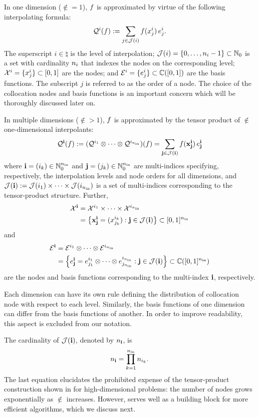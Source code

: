 In one dimension ($\nin = 1$), $f$ is approximated by virtue of the following
interpolating formula:
\begin{equation} \elab{tensor-1d}
  \tensor{i}(\f) := \sum_{j \in \index(i)} \f(\x^i_j) \, \e^i_j.
\end{equation}
The superscript $i \in \natural$ is the level of interpolation; $\mathcal{J}(i) = \{
0, \dots, n_i - 1 \} \subset \mathbb{N}_0$ is a set with cardinality $n_i$ that
indexes the nodes on the corresponding level; $\mathcal{X}^i = \{ x^i_j \} \subset [0,
1]$ are the nodes; and $\mathcal{E}^i = \{ e^i_j \} \subset \mathbb{C}([0, 1])$ are the
basis functions. The subscript $j$ is referred to as the order of a node. The
choice of the collocation nodes and basis functions is an important concern
which will be thoroughly discussed later on.

In multiple dimensions ($\nin > 1$), $f$ is approximated by the tensor product
of $\nin$ one-dimensional interpolants:
\begin{equation} \elab{tensor}
  \tensor{\vi}(\f) := (\tensor{i_1} \otimes \cdots \otimes \tensor{i_\nin})(\f) = \sum_{\vj \in \index(\vi)} \f(\vx^\vi_\vj) \, \e^\vi_\vj
\end{equation}
where $\mathbf{i} = (i_k) \in \mathbb{N}_0^{n_\text{in}}$ and $\mathbf{j} = (j_k) \in \mathbb{N}_0^{n_\text{in}}$ are
multi-indices specifying, respectively, the interpolation levels and node orders
for all dimensions, and $\mathcal{J}(\mathbf{i}) := \mathcal{J}(i_1) \times \cdots \times
\mathcal{J}(i_{n_\text{in}})$ is a set of multi-indices corresponding to the tensor-product
structure. Further,
\begin{align}
  \X^\vi &= \X^{i_1} \times \cdots \times \X^{i_\nin} \elab{collocation-nodes} \\
         &= \left\{ \vx^\vi_\vj = (\x^{i_k}_{j_k}): \vj \in \index(\vi) \right\} \subset [0, 1]^\nin \nonumber
\end{align}
and
\begin{align}
  \E^\vi &= \E^{i_1} \otimes \cdots \otimes \E^{i_\nin} \elab{basis-functions} \\
         &= \left\{ \e^\vi_\vj = \e^{i_1}_{j_1} \otimes \cdots \otimes \e^{i_\nin}_{j_\nin}: \vj \in \index(\vi) \right\} \subset \continuous([0, 1]^\nin) \nonumber
\end{align}
are the nodes and basis functions corresponding to the multi-index $\mathbf{i}$,
respectively.
\begin{remark}
Each dimension can have its own rule defining the distribution of collocation
node with respect to each level. Similarly, the basis functions of one dimension
can differ from the basis functions of another. In order to improve readability,
this aspect is excluded from our notation.
\end{remark}
The cardinality of $\mathcal{J}(\mathbf{i})$, denoted by $n_{\mathbf{i}}$, is
\begin{equation} \elab{tensor-cardinality}
  \n_\vi = \prod_{k = 1}^\nin \n_{i_k}.
\end{equation}
The last equation elucidates the prohibited expense of the tensor-product
construction shown in  for high-dimensional problems: the number of
nodes grows exponentially as $\nin$ increases. However,  serves
well as a building block for more efficient algorithms, which we discuss next.
